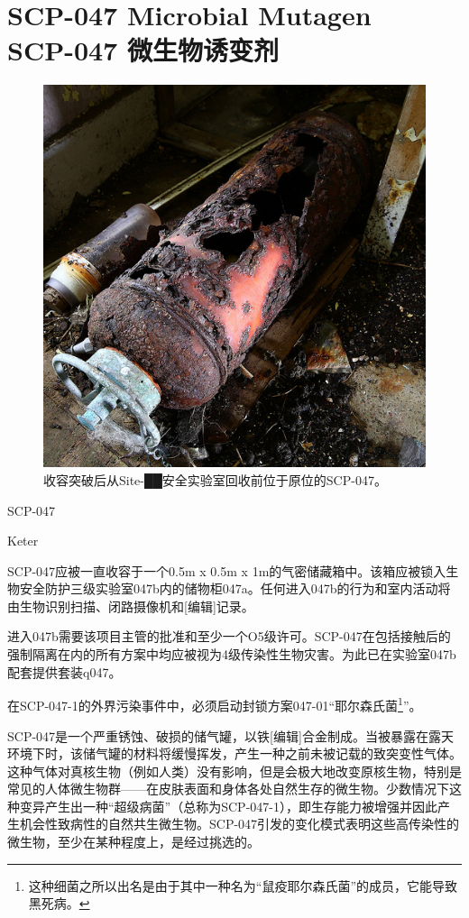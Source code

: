 \chapter[SCP-047 微生物诱变剂]{
    SCP-047 Microbial Mutagen\\
    SCP-047 微生物诱变剂
}

\label{chap:SCP-047}

\begin{figure}[H]
    \centering
    \includegraphics[width=0.5\linewidth]{images/SCP-047.jpg}
    \caption*{收容突破后从Site-██安全实验室回收前位于原位的SCP-047。}
\end{figure}

SCP-047

Keter

SCP-047应被一直收容于一个0.5m x 0.5m x 1m的气密储藏箱中。该箱应被锁入生物安全防护三级实验室047b内的储物柜047a。任何进入047b的行为和室内活动将由生物识别扫描、闭路摄像机和{[}编辑]记录。

进入047b需要该项目主管的批准和至少一个O5级许可。SCP-047在包括接触后的强制隔离在内的所有方案中均应被视为4级传染性生物灾害。为此已在实验室047b配套提供套装q047。

在SCP-047-1的外界污染事件中，必须启动封锁方案047-01“耶尔森氏菌\footnote{这种细菌之所以出名是由于其中一种名为“鼠疫耶尔森氏菌”的成员，它能导致黑死病。}”。

SCP-047是一个严重锈蚀、破损的储气罐，以铁{[}编辑]合金制成。当被暴露在露天环境下时，该储气罐的材料将缓慢挥发，产生一种之前未被记载的致突变性气体。这种气体对真核生物（例如人类）没有影响，但是会极大地改变原核生物，特别是常见的人体微生物群——在皮肤表面和身体各处自然生存的微生物。少数情况下这种变异产生出一种“超级病菌”（总称为SCP-047-1），即生存能力被增强并因此产生机会性致病性的自然共生微生物。SCP-047引发的变化模式表明这些高传染性的微生物，至少在某种程度上，是经过挑选的。

